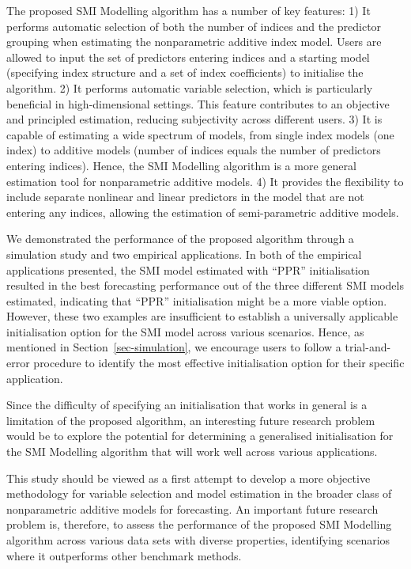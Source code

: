 \documentclass[
  11pt,
  a4paper,
]{article}
\begin{document}
The proposed SMI Modelling algorithm has a number of key features: 1) It
performs automatic selection of both the number of indices and the
predictor grouping when estimating the nonparametric additive index
model. Users are allowed to input the set of predictors entering indices
and a starting model (specifying index structure and a set of index
coefficients) to initialise the algorithm. 2) It performs automatic
variable selection, which is particularly beneficial in high-dimensional
settings. This feature contributes to an objective and principled
estimation, reducing subjectivity across different users. 3) It is
capable of estimating a wide spectrum of models, from single index
models (one index) to additive models (number of indices equals the
number of predictors entering indices). Hence, the SMI Modelling
algorithm is a more general estimation tool for nonparametric additive
models. 4) It provides the flexibility to include separate nonlinear and
linear predictors in the model that are not entering any indices,
allowing the estimation of semi-parametric additive models.

We demonstrated the performance of the proposed algorithm through a
simulation study and two empirical applications. In both of the
empirical applications presented, the SMI model estimated with ``PPR''
initialisation resulted in the best forecasting performance out of the
three different SMI models estimated, indicating that ``PPR''
initialisation might be a more viable option. However, these two
examples are insufficient to establish a universally applicable
initialisation option for the SMI model across various scenarios. Hence,
as mentioned in Section~\ref{sec-simulation}, we encourage users to
follow a trial-and-error procedure to identify the most effective
initialisation option for their specific application.

Since the difficulty of specifying an initialisation that works in
general is a limitation of the proposed algorithm, an interesting future
research problem would be to explore the potential for determining a
generalised initialisation for the SMI Modelling algorithm that will
work well across various applications.

This study should be viewed as a first attempt to develop a more
objective methodology for variable selection and model estimation in the
broader class of nonparametric additive models for forecasting. An
important future research problem is, therefore, to assess the
performance of the proposed SMI Modelling algorithm across various data
sets with diverse properties, identifying scenarios where it outperforms
other benchmark methods.
\end{document}
